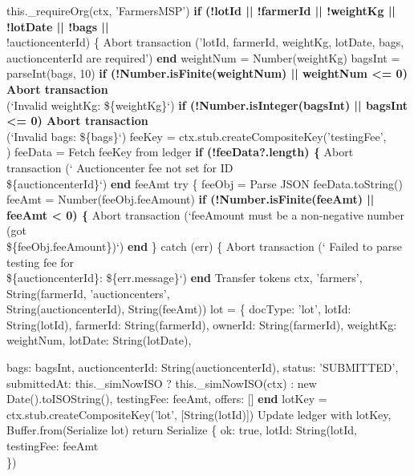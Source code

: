 \documentclass[12pt]{article}
\begin{document}
\begin{algorithm}[H]
\caption{submitProduce() (Part 1 of 2)}
this.\_requireOrg(ctx, 'FarmersMSP')\;
\textbf{if (!lotId || !farmerId || !weightKg || !lotDate || !bags ||}\\
\quad !auctioncenterId) \{\;
Abort transaction ('lotId, farmerId, weightKg, lotDate, bags,\\
\quad auctioncenterId are required')\;
\textbf{end}\;
weightNum = Number(weightKg)\;
bagsInt   = parseInt(bags, 10)\;
\textbf{if (!Number.isFinite(weightNum) || weightNum <= 0) Abort transaction}\\
\quad (`Invalid weightKg: \$\{weightKg\}`)\;
\textbf{if (!Number.isInteger(bagsInt) || bagsInt <= 0)   Abort transaction}\\
\quad (`Invalid bags: \$\{bags\}`)\;
feeKey  = ctx.stub.createCompositeKey('testingFee',\\
)\;
feeData = Fetch feeKey from ledger\;
\textbf{if (!feeData?.length) \{}\;
Abort transaction (` Auctioncenter fee not set for ID\\
\quad \$\{auctioncenterId\}`)\;
\textbf{end}\;
feeAmt\;
try \{\;
feeObj = Parse JSON feeData.toString()\;
feeAmt = Number(feeObj.feeAmount)\;
\textbf{if (!Number.isFinite(feeAmt) || feeAmt < 0) \{}\;
Abort transaction (`feeAmount must be a non-negative number (got\\
\quad \$\{feeObj.feeAmount\})`)\;
\textbf{end}\;
\} catch (err) \{\;
Abort transaction (` Failed to parse testing fee for\\
\quad \$\{auctioncenterId\}: \$\{err.message\}`)\;
\textbf{end}\;
Transfer tokens ctx, 'farmers', String(farmerId, 'auctioncenters',\\
\quad String(auctioncenterId), String(feeAmt))\;
lot = \{\;
docType: 'lot',\;
lotId: String(lotId),\;
farmerId: String(farmerId),\;
ownerId: String(farmerId),\;
weightKg: weightNum,\;
lotDate: String(lotDate),\;
\end{algorithm}


\begin{algorithm}[H]
\caption{submitProduce() (Part 2 of 2)}
bags: bagsInt,\;
auctioncenterId: String(auctioncenterId),\;
status: 'SUBMITTED',\;
submittedAt: this.\_simNowISO ? this.\_simNowISO(ctx) : new\\
\quad Date().toISOString(),\;
testingFee: feeAmt,\;
offers: []\;
\textbf{end}\;
lotKey = ctx.stub.createCompositeKey('lot', [String(lotId)])\;
Update ledger with lotKey, Buffer.from(Serialize lot)\;
return Serialize \{ ok: true, lotId: String(lotId, testingFee: feeAmt\\
\quad \})\;
\end{algorithm}
\end{document}
